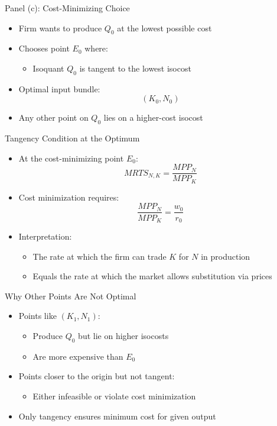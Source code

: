 \documentclass[aspectratio=169]{beamer}
\begin{document}

\begin{frame}{Panel (c): Cost-Minimizing Choice}
\begin{itemize}[<+->]
\item Firm wants to produce $Q_0$ at the lowest possible cost
\item Chooses point $E_0$ where:
\begin{itemize}[<+->]
\item Isoquant $Q_0$ is tangent to the lowest isocost
\end{itemize}
\item Optimal input bundle:
\[
(K_0, N_0)
\]
\item Any other point on $Q_0$ lies on a higher-cost isocost
\end{itemize}
\end{frame}


\begin{frame}{Tangency Condition at the Optimum}
\begin{itemize}[<+->]
\item At the cost-minimizing point $E_0$:
\[
MRTS_{N,K} = \frac{MPP_N}{MPP_K}
\]
\item Cost minimization requires:
\[
\frac{MPP_N}{MPP_K} = \frac{w_0}{r_0}
\]
\item Interpretation:
\begin{itemize}[<+->]
\item The rate at which the firm can trade $K$ for $N$ in production
\item Equals the rate at which the market allows substitution via prices
\end{itemize}
\end{itemize}
\end{frame}


\begin{frame}{Why Other Points Are Not Optimal}
\begin{itemize}[<+->]
\item Points like $(K_1, N_1)$:
\begin{itemize}[<+->]
\item Produce $Q_0$ but lie on higher isocosts
\item Are more expensive than $E_0$
\end{itemize}
\item Points closer to the origin but not tangent:
\begin{itemize}[<+->]
\item Either infeasible or violate cost minimization
\end{itemize}
\item Only tangency ensures minimum cost for given output
\end{itemize}
\end{frame}
\end{document}
